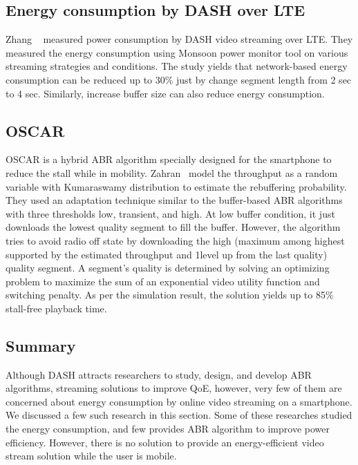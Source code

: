 \subsection{Energy consumption by DASH over LTE}
Zhang \etal\ \cite{10.1145/2910018.2910656} measured power consumption by DASH video streaming over LTE. They measured the energy consumption using Monsoon power monitor \cite{monsoonmonitor} tool on various streaming strategies and conditions. The study yields that network-based energy consumption can be reduced up to 30\% just by change segment length from 2 sec to 4 sec. Similarly, increase buffer size can also reduce energy consumption.

\subsection{OSCAR}
OSCAR\cite{10.1145/2910018.2910655} is a hybrid ABR algorithm specially designed for the smartphone to reduce the stall while in mobility. Zahran \etal\ model the throughput as a random variable with Kumaraswamy distribution \cite{jones2009kumaraswamy} to estimate the rebuffering probability. They used an adaptation technique similar to the buffer-based ABR algorithms with three thresholds low, transient, and high. At low buffer condition, it just downloads the lowest quality segment to fill the buffer. However, the algorithm tries to avoid radio off state by downloading the high (maximum among highest supported by the estimated throughput and 1level up from the last quality) quality segment. A segment's quality is determined by solving an optimizing problem to maximize the sum of an exponential video utility function and switching penalty. As per the simulation result, the solution yields up to 85\% stall-free playback time.

\subsection{Summary}
Although DASH attracts researchers to study, design, and develop ABR algorithms, streaming solutions to improve QoE, however, very few of them are concerned about energy consumption by online video streaming on a smartphone. We discussed a few such research in this section. Some of these researches studied the energy consumption\cite{10.1145/2910018.2910656}, and few provides ABR algorithm to improve power efficiency\cite{10.1145/2910018.2910655}. However, there is no solution to provide an energy-efficient video stream solution while the user is mobile.